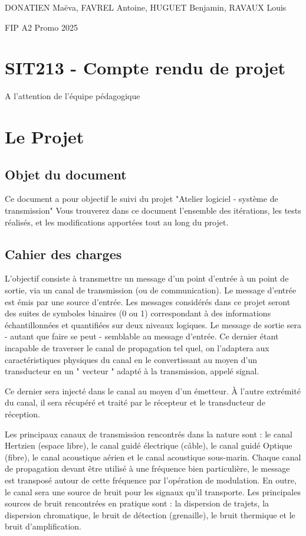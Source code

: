 

DONATIEN Maëva,
FAVREL Antoine,
HUGUET Benjamin,
RAVAUX Louis

FIP A2 Promo 2025

\section{SIT213 - Compte rendu de projet}

A l'attention de l'équipe pédagogique
\newpage
\section{Le Projet}
\subsection{Objet du document}

Ce document a pour objectif le suivi du projet "Atelier logiciel - système de transmission"
Vous trouverez dans ce document l'ensemble des itérations, les tests réalisés, et les modifications apportées tout au long du projet.

\subsection{Cahier des charges}

L'objectif consiste à transmettre un message d'un point d'entrée à un point de sortie, via un canal de transmission (ou de communication). Le message d'entrée est émis par une source d'entrée. Les messages considérés dans ce projet seront des suites de symboles binaires (0 ou 1) correspondant à des informations échantillonnées et quantifiées sur deux niveaux logiques. Le message de sortie sera - autant que faire se peut - semblable au message d'entrée. Ce dernier étant incapable de traverser le canal de propagation tel quel, on l'adaptera aux caractéristiques physiques du canal en le convertissant au moyen d'un transducteur en un " vecteur " adapté à la transmission, appelé signal.

Ce dernier sera injecté dans le canal au moyen d'un émetteur. À l'autre extrémité du canal, il sera récupéré et traité par le récepteur et le transducteur de réception.

Les principaux canaux de transmission rencontrés dans la nature sont : le canal Hertzien (espace libre), le canal guidé électrique (câble), le canal guidé Optique (fibre), le canal acoustique aérien et le canal acoustique sous-marin. Chaque canal de propagation devant être utilisé à une fréquence bien particulière, le message est transposé autour de cette fréquence par l'opération de modulation. En outre, le canal sera une source de bruit pour les signaux qu'il transporte. Les principales sources de bruit rencontrées en pratique sont : la dispersion de trajets, la dispersion chromatique, le bruit de détection (grenaille), le bruit thermique et le bruit d'amplification.

